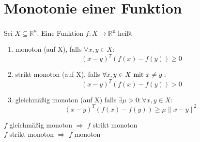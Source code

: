	\section{Monotonie einer Funktion}
	
	\begin{definition}[Monotonie]
		Sei $X\subseteq\mathbb{R}^n$. Eine Funktion $f : X \rightarrow \mathbb{R}$\textsuperscript{n} heißt
		\begin{enumerate}
			\item monoton (auf X), falls $\forall x,y \in X:$
			\begin{equation*}
			(x-y)^T(f(x)-f(y)) \geq 0
			\end{equation*}
			\item strikt monoton (auf X), falls $\forall x,y \in X \ \textnormal{mit} \ x \neq y:$
			\begin{equation*}
			(x-y)^T(f(x)-f(y)) > 0
			\end{equation*}
			\item gleichmäßig monoton (auf X) falls $\exists \mu > 0 : \forall x,y \in X:$
			\begin{equation*}
			(x-y)^T(f(x)-f(y)) \geq \mu \| x-y \|^2
			\end{equation*}
		\end{enumerate}
	\end{definition}
	
	\begin{bemerkung}
		$f$ gleichmäßig monoton \( \Rightarrow \) $f$ strikt monoton \\ 
		$f$ strikt monoton \( \Rightarrow \) $f$ monoton
	\end{bemerkung}
	

